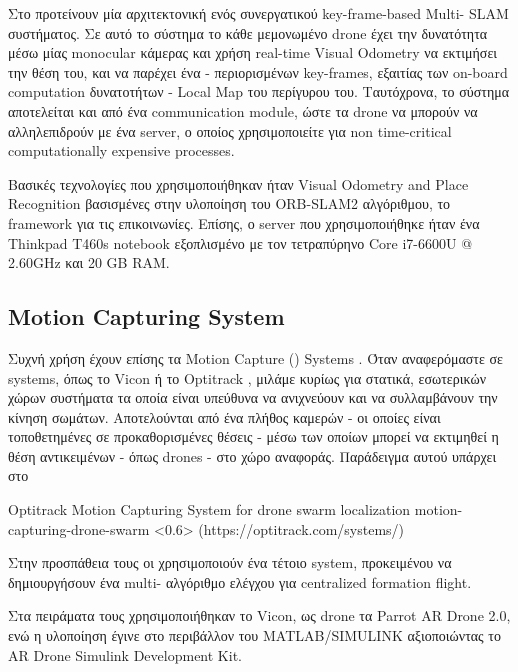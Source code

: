 Στο \cite{vslam-for-drone-localization} προτείνουν μία αρχιτεκτονική ενός συνεργατικού key-frame-based Multi- {SLAM} συστήματος. Σε αυτό το σύστημα το κάθε μεμονωμένο drone έχει την δυνατότητα μέσω μίας monocular κάμερας και χρήση real-time Visual Odometry να εκτιμήσει την θέση του, και να παρέχει ένα - περιορισμένων key-frames, εξαιτίας των on-board computation δυνατοτήτων - Local Map του περίγυρου του. Ταυτόχρονα, το σύστημα αποτελείται και από ένα communication module, ώστε τα drone να μπορούν να αλληλεπιδρούν με ένα server, ο οποίος χρησιμοποιείτε για non time-critical computationally expensive processes. 

Βασικές τεχνολογίες που χρησιμοποιήθηκαν ήταν Visual Odometry and Place Re\-co\-gni\-tion βασισμένες στην υλοποίηση του ORB-SLAM2 αλγόριθμου, το  framework για τις επικοινωνίες. Επίσης, ο server που χρησιμοποιήθηκε ήταν ένα Thinkpad T460s notebook εξοπλισμένο με τον τετραπύρηνο Core i7-6600U @ 2.60GHz και 20 GB RAM.

\subsection{Motion Capturing System} \label{sec:related-motion-capturing-systems}
Συχνή χρήση έχουν επίσης τα Motion Capture () Systems \cite{motion-capture}. Όταν αναφερόμαστε σε  systems, όπως το Vicon \cite{vicon} ή το Optitrack \cite{optitrack}, μιλάμε κυρίως για στατικά, εσωτερικών χώρων συστήματα 
τα οποία είναι υπεύθυνα να ανιχνεύουν και να συλλαμβάνουν την κίνηση σωμάτων. Αποτελούνται από ένα πλήθος καμερών - οι οποίες είναι τοποθετημένες σε προκαθορισμένες θέσεις - μέσω των οποίων μπορεί να εκτιμηθεί η θέση αντικειμένων - όπως drones - στο χώρο αναφοράς. Παράδειγμα αυτού υπάρχει στο 

%
{Optitrack Motion Capturing System for drone swarm localization}%
{motion-capturing-drone-swarm}%
<0.6>%
(https://optitrack.com/systems/)

Στην προσπάθεια τους οι \cite{related-motion-captu} χρησιμοποιούν ένα τέτοιο  system, προκειμένου να δημιουργήσουν ένα multi- αλγόριθμο ελέγχου για centralized formation flight. 

Στα πειράματα τους χρησιμοποιήθηκαν το Vicon, ως drone τα Parrot AR Drone 2.0, ενώ η υλοποίηση έγινε στο περιβάλλον του MATLAB/SI\-MU\-LI\-NK αξιοποιώντας το AR Drone Simulink Development Kit.
